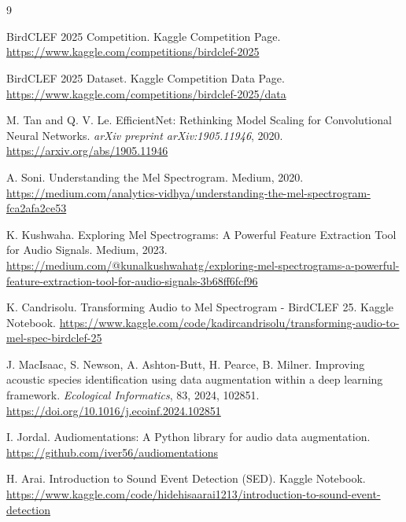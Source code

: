 \documentclass[ERTS, 2025]{ERTS}
\begin{document}
\section*{}
\begin{thebibliography}{9}

BirdCLEF 2025 Competition.
\newblock Kaggle Competition Page.
\newblock \url{https://www.kaggle.com/competitions/birdclef-2025}

BirdCLEF 2025 Dataset.
\newblock Kaggle Competition Data Page.
\newblock \url{https://www.kaggle.com/competitions/birdclef-2025/data}

M. Tan and Q. V. Le.
\newblock EfficientNet: Rethinking Model Scaling for Convolutional Neural Networks.
\newblock \textit{arXiv preprint arXiv:1905.11946}, 2020.
\newblock \url{https://arxiv.org/abs/1905.11946}

A. Soni.
\newblock Understanding the Mel Spectrogram.
\newblock Medium, 2020.
\newblock \url{https://medium.com/analytics-vidhya/understanding-the-mel-spectrogram-fca2afa2ce53}

K. Kushwaha.
\newblock Exploring Mel Spectrograms: A Powerful Feature Extraction Tool for Audio Signals.
\newblock Medium, 2023.
\newblock \url{https://medium.com/@kunalkushwahatg/exploring-mel-spectrograms-a-powerful-feature-extraction-tool-for-audio-signals-3b68ff6fcf96}

K. Candrisolu.
\newblock Transforming Audio to Mel Spectrogram - BirdCLEF 25.
\newblock Kaggle Notebook.
\newblock \url{https://www.kaggle.com/code/kadircandrisolu/transforming-audio-to-mel-spec-birdclef-25}

J. MacIsaac, S. Newson, A. Ashton-Butt, H. Pearce, B. Milner.
\newblock Improving acoustic species identification using data augmentation within a deep learning framework.
\newblock \textit{Ecological Informatics}, 83, 2024, 102851.
\newblock \url{https://doi.org/10.1016/j.ecoinf.2024.102851}

I. Jordal.
\newblock Audiomentations: A Python library for audio data augmentation.
\newblock \url{https://github.com/iver56/audiomentations}

H. Arai.
\newblock Introduction to Sound Event Detection (SED).
\newblock Kaggle Notebook.
\newblock \url{https://www.kaggle.com/code/hidehisaarai1213/introduction-to-sound-event-detection}


\end{thebibliography}
\end{document}
